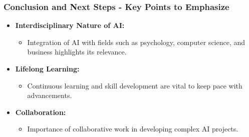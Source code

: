 \documentclass{beamer}
\begin{document}
\begin{frame}[fragile]
    \frametitle{Conclusion and Next Steps - Key Points to Emphasize}
    \begin{itemize}
        \item \textbf{Interdisciplinary Nature of AI:}
        \begin{itemize}
            \item Integration of AI with fields such as psychology, computer science, and business highlights its relevance.
        \end{itemize}
        
        \item \textbf{Lifelong Learning:}
        \begin{itemize}
            \item Continuous learning and skill development are vital to keep pace with advancements.
        \end{itemize}
        
        \item \textbf{Collaboration:}
        \begin{itemize}
            \item Importance of collaborative work in developing complex AI projects.
        \end{itemize}
    \end{itemize}
\end{frame}
\end{document}
